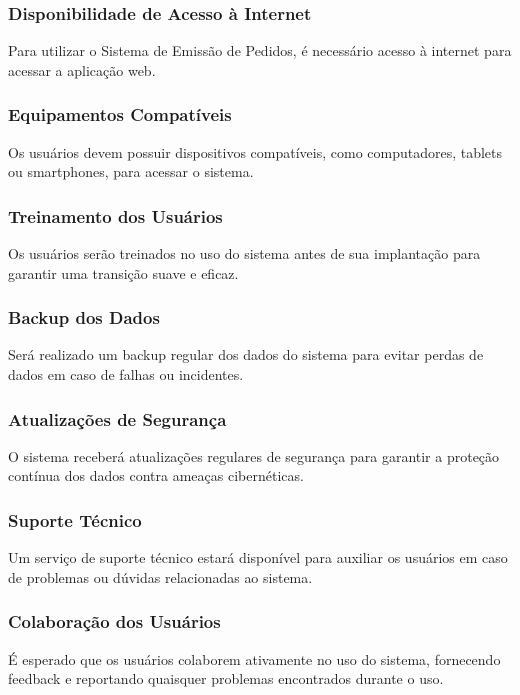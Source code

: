\subsubsection*{Disponibilidade de Acesso à Internet}
Para utilizar o Sistema de Emissão de Pedidos, é necessário acesso à internet para acessar a aplicação web.

\subsubsection*{Equipamentos Compatíveis}
Os usuários devem possuir dispositivos compatíveis, como computadores, tablets ou smartphones, para acessar o sistema.

\subsubsection*{Treinamento dos Usuários}
Os usuários serão treinados no uso do sistema antes de sua implantação para garantir uma transição suave e eficaz.

\subsubsection*{Backup dos Dados}
Será realizado um backup regular dos dados do sistema para evitar perdas de dados em caso de falhas ou incidentes.

\subsubsection*{Atualizações de Segurança}
O sistema receberá atualizações regulares de segurança para garantir a proteção contínua dos dados contra ameaças cibernéticas.

\subsubsection*{Suporte Técnico}
Um serviço de suporte técnico estará disponível para auxiliar os usuários em caso de problemas ou dúvidas relacionadas ao sistema.

\subsubsection*{Colaboração dos Usuários}
É esperado que os usuários colaborem ativamente no uso do sistema, fornecendo feedback e reportando quaisquer problemas encontrados durante o uso.